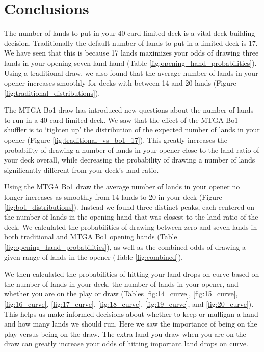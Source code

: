 \documentclass[oneside]{book}   %
\begin{document}
\chapter{Conclusions}

The number of lands to put in your 40 card limited deck is a vital deck building decision. Traditionally the default number of lands to put in a limited deck is 17. We have seen that this is because 17 lands maximizes your odds of drawing three lands in your opening seven land hand (Table \ref{fig:opening_hand_probabilities}). Using a traditional draw, we also found that the average number of lands in your opener increases smoothly for decks with between 14 and 20 lands (Figure \ref{fig:traditional_distributions}).   

The MTGA Bo1 draw has introduced new questions about the number of lands to run in a 40 card limited deck. We saw that the effect of the MTGA Bo1 shuffler is to `tighten up' the distribution of the expected number of lands in your opener (Figure \ref{fig:traditional_vs_bo1_17}). This greatly increases the probability of drawing a number of lands in your opener close to the land ratio of your deck overall, while decreasing the probability of drawing a number of lands significantly different from your deck's land ratio. 

Using the MTGA Bo1 draw the average number of lands in your opener no longer increases as smoothly from 14 lands to 20 in your deck (Figure \ref{fig:bo1_distributions}). Instead we found three distinct peaks, each centered on the number of lands in the opening hand that was closest to the land ratio of the deck. We calculated the probabilities of drawing between zero and seven lands in both traditional and MTGA Bo1 opening hands (Table \ref{fig:opening_hand_probabilities}), as well as the combined odds of drawing a given range of lands in the opener (Table \ref{fig:combined}).

We then calculated the probabilities of hitting your land drops on curve based on the number of lands in your deck, the number of lands in your opener, and whether you are on the play or draw (Tables \ref{fig:14_curve}, \ref{fig:15_curve}, \ref{fig:16_curve}, \ref{fig:17_curve}, \ref{fig:18_curve}, \ref{fig:19_curve}, and \ref{fig:20_curve}). This helps us make informed decisions about whether to keep or mulligan a hand and how many lands we should run. Here we saw the importance of being on the play versus being on the draw. The extra land you draw when you are on the draw can greatly increase your odds of hitting important land drops on curve. 
\end{document}
